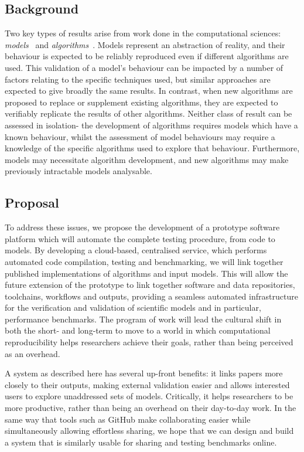 \documentclass[a4paper,11pt]{article}
\begin{document}

\subsection*{Background}
Two key types of results arise from work done in the computational
sciences: {\emph{models}}~\cite{crick-et-al_recomp14} and {\emph{algorithms}}~\cite{crick-et-al_wssspe2}. Models represent an
abstraction of reality, and their behaviour is expected to be reliably
reproduced even if different algorithms are used. This validation of a
model's behaviour can be impacted by a number of factors relating to
the specific techniques used, but similar approaches are expected to
give broadly the same results.  In contrast, when new algorithms are
proposed to replace or supplement existing algorithms, they are
expected to verifiably replicate the results of other algorithms.
Neither class of result can be assessed in isolation- the development 
of algorithms requires models which have a known behaviour, whilst
the assessment of model behaviours may require a knowledge of the 
specific algorithms used to explore that behaviour. Furthermore, models
may necessitate algorithm development, and new algorithms may make 
previously intractable models analysable.

\subsection*{Proposal}
To address these issues, we propose the development of a prototype
software platform which will automate the complete testing procedure,
from code to models. By developing a cloud-based, centralised service,
which performs automated code compilation, testing and benchmarking, 
we will link together published implementations of algorithms and 
input models. This will allow the future extension of the prototype
to link together software and data repositories, toolchains, workflows
and outputs, providing a seamless automated infrastructure for the
verification and validation of scientific models and in particular,
performance benchmarks. The program of work will lead the cultural 
shift in both the short- and long-term to move to a world in which
computational reproducibility helps researchers achieve their goals,
rather than being perceived as an overhead.

A system as described here has several up-front benefits: it links
papers more closely to their outputs, making external validation
easier and allows interested users to explore unaddressed sets of
models. Critically, it helps researchers to be more productive, rather
than being an overhead on their day-to-day work. In the same way that
tools such as GitHub make collaborating easier while simultaneously
allowing effortless sharing, we hope that we can design and build a
system that is similarly usable for sharing and testing benchmarks
online.
\end{document}
